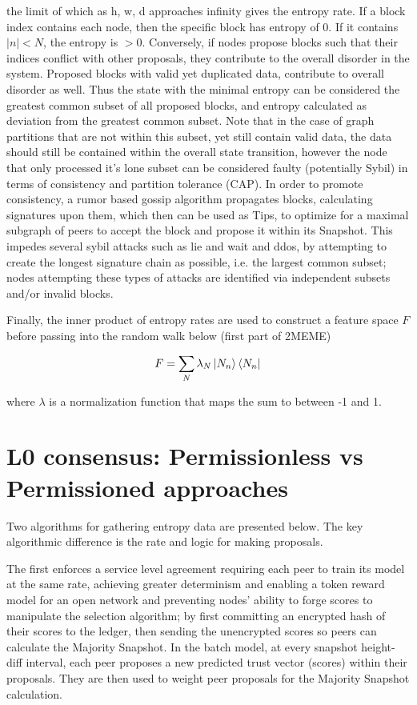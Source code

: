 \documentclass{article}
\begin{document}
	the limit of which as h, w, d approaches infinity gives the entropy rate.
If a block index contains each node, then the specific block has entropy of 0. If it contains $|n| < N$, the entropy is $> 0$. Conversely, if nodes propose blocks such that their indices conflict with other proposals, they contribute to the overall disorder in the system. Proposed blocks with valid yet duplicated data, contribute to overall disorder as well. Thus the state with the minimal entropy can be considered the greatest common subset of all proposed blocks, and entropy calculated as deviation from the greatest common subset. Note that in the case of graph partitions that are not within this subset, yet still contain valid data, the data should still be contained within the overall state transition, however the node that only processed it’s lone subset can be considered faulty (potentially Sybil) in terms of consistency and partition tolerance (CAP). In order to promote consistency, a rumor based gossip algorithm propagates blocks, calculating signatures upon them, which then can be used as Tips, to optimize for a maximal subgraph of peers to accept the block and propose it within its Snapshot. This impedes several sybil attacks such as lie and wait and ddos, by attempting to create the longest signature chain as possible, i.e. the largest common subset; nodes attempting these types of attacks are identified via independent subsets and/or invalid blocks.

Finally, the inner product of entropy rates are used to construct a feature space $F$ before passing into the random walk below (first part of 2MEME)

\begin{equation}
F = \sum_N \lambda_N \ket{N_n} \bra{N_n}
\end{equation}

where $\lambda$ is a normalization function that maps the sum to between -1 and 1.

\section {L0 consensus: Permissionless vs Permissioned approaches}
Two algorithms for gathering entropy data are presented below. The key algorithmic difference is the rate and logic for making proposals. 

The first enforces a service level agreement requiring each peer to train its model at the same rate, achieving greater determinism and enabling a token reward model for an open network and preventing nodes' ability to forge scores to manipulate the selection algorithm; by first committing an encrypted hash of their scores to the ledger, then sending the unencrypted scores so peers can calculate the Majority Snapshot. In the batch model, at every snapshot height-diff interval, each peer proposes a new predicted trust vector (scores) within their proposals. They are then used to weight peer proposals for the Majority Snapshot calculation.
\end{document}
